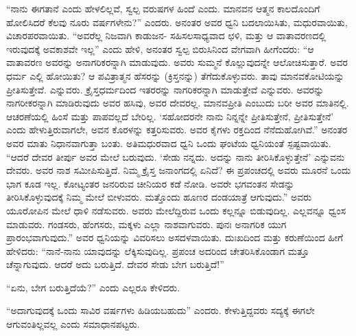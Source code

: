 “ನಾನು ಈಗತಾನೆ ಎಂದು ಹೇಳಲಿಲ್ಲವೆ, ಸ್ವಲ್ಪ ವರುಷಗಳ ಹಿಂದೆ ಎಂದು. ಮಾನವನ ಆತ್ಮನ ಕಾಲದೊಂದಿಗೆ ಹೋಲಿಸಿದರೆ ಕೆಲವು ನೂರು ವರ್ಷಗಳೇನು?” ಎಂದರು. ಅನಂತರ ಅವರ ಧ್ವನಿ ಬದಲಾಯಿಸಿತು, ಮಧುರವಾಯಿತು, ವಿಚಾರಪರವಾಯಿತು. “ಅವರೆಲ್ಲ ನಿಜವಾಗಿ ಕಾಡುಜನ- ಸಹಿಸಲಸಾಧ್ಯವಾದ ಛಳಿ, ಮತ್ತು ಆ ವಾತಾವರಣದಲ್ಲಿ ಇರುವುದಕ್ಕೆ ಅವಕಾಶವೇ ಇಲ್ಲ” ಎಂದು ಹೇಳಿ, ಅನಂತರ ಸ್ವಲ್ಪ ಬಿರುಸಿನಿಂದ ವೇಗವಾಗಿ ಹೀಗೆಂದರು: “ಆ ವಾತಾವರಣ ಅವರನ್ನು ಅನಾಗರಿಕರನ್ನಾಗಿ ಮಾಡುವುದು. ಅವರು ಸುಮ್ಮನೆ ಕೊಲ್ಲುವುದನ್ನೇ ಆಲೋಚಿಸುತ್ತಾರೆ. ಅವರ ಧರ್ಮ ಎಲ್ಲಿ ಹೋಯಿತು? ಆ ಪವಿತ್ರಾತ್ಮನ ಹೆಸರನ್ನು (ಕ್ರಿಸ್ತನನ್ನು) ತೆಗೆದುಕೊಳ್ಳುವರು. ತಾವು ಮಾನವಕೋಟಿಯನ್ನು ಪ್ರೀತಿಸುತ್ತೇವೆ. ಎನ್ನುವರು. ಕ್ರೈಸ್ತಧರ್ಮದಿಂದ ಇತರರನ್ನು ನಾಗರಿಕರನ್ನಾಗಿ ಮಾಡುತ್ತೇವೆ ಎನ್ನುವರು. ಅವರನ್ನು ನಾಗರೀಕರನ್ನಾಗಿ ಮಾಡಿರುವುದು ಅವರ ಹಸಿವು, ಅವರ ದೇವರಲ್ಲ. ಮಾನವಪ್ರೀತಿ ಎಂಬುದು ಬರೀ ಅವರ ಮಾತಿನಲ್ಲಿ. ಆಚರಣೆಯಲ್ಲಿ ಹಿಂಸೆ ಮತ್ತು ಪಾಪವಲ್ಲದೆ ಬೇರಿಲ್ಲ. ‘ಸಹೋದರನೇ ನಾನು ನಿನ್ನನ್ನೇ ಪ್ರೀತಿಸುತ್ತೇನೆ, ಪ್ರೀತಿಸುತ್ತೇನೆ’ ಎಂದು ಹೇಳುತ್ತಿರುವಾಗಲೇ, ಅವನ ಕೊರಳನ್ನು ಕತ್ತರಿಸುವರು. ಅವರ ಕೈಗಳು ರಕ್ತದಿಂದ ನೆನೆದುಹೋಗಿವೆ.” ಅನಂತರ ಅವರ ಮಾತು ನಿಧಾನವಾಗುತ್ತಾ ಬಂತು. ಅತಿಮಧುರವಾದ ಧ್ವನಿ ಒಂದು ಘಂಟೆಯ ಧ್ವನಿಯಂತೆ ಸ್ಪಷ್ಟವಾಯಿತು. “ಆದರೆ ದೇವರ ತೀರ್ಪು ಅವರ ಮೇಲೆ ಬರುವುದು. ‘ಸೇಡು ನನ್ನದು. ಅದನ್ನು ನಾನು ತೀರಿಸಿಕೊಳ್ಳುತ್ತೇನೆ’ ಎನ್ನುವನು ದೇವರು. ಅವರ ನಾಶ ಸಮೀಪಿಸುತ್ತಿದೆ. ನಿಮ್ಮ ಕ್ರೈಸ್ತ ಜನಾಂಗದಲ್ಲಿ ಏನಿದೆ? ಈ ಪ್ರಪಂಚದಲ್ಲಿ ಅವರು ಮೂರನೆ ಒಂದು ಭಾಗ ಕೂಡ ಇಲ್ಲ. ಕೋಟ್ಯಂತರ ಜನರಿರುವ ಚೀನಿಯರ ಕಡೆ ನೋಡಿ. ಅವರೇ ಭಗವಂತನ ಸೇಡನ್ನು ತೀರಿಸಿಕೊಳ್ಳುವುದಕ್ಕೆ ನಿಮ್ಮ ಮೇಲೆ ಬೀಳುವರು. ಮತ್ತೊಂದು ಹೂಣರ ದಂಡಯಾತ್ರೆ ಆಗುವುದು.” ಅವರು ಯೂರೋಪಿನ ಮೇಲೆ ಧಾಳಿ ನಡೆಸುವರು. ಅವರು ಮೇಲೆದ್ದಿರುವ ಒಂದು ಕಲ್ಲನ್ನೂ ಬಿಡುವುದಿಲ್ಲ. ಎಲ್ಲವನ್ನೂ ಧ್ವಂಸ ಮಾಡುವರು. ಗಂಡಸರು, ಹೆಂಗಸರು, ಮಕ್ಕಳು ಎಲ್ಲಾ ನಾಶವಾಗುವರು. ಪುನಃ ಅನಾಗರಿಕ ಯುಗ ಪ್ರಾರಂಭವಾಗುವುದು.” ಅವರ ಧ್ವನಿಯನ್ನು ವಿವರಿಸಲು ಅಸದಳವಾಯಿತು. ದುಃಖದಿಂದ ಮತ್ತು ಕರುಣೆಯಿಂದ ಹೀಗೆ ಹೇಳಿದರು: “ನಾನೆ-ನಾನು ಯಾವುದನ್ನು ಲೆಕ್ಕಿಸುವುದಿಲ್ಲ. ಪ್ರಪಂಚ ಅದರಿಂದ ಚೇತರಿಸಿಕೊಂಡಾಗ ಮತ್ತೂ ಚೆನ್ನಾಗುವುದು. ಆದರೆ ಅದು ಬರುತ್ತಿದೆ. ದೇವರ ಸೇಡು ಬೇಗ ಬರುತ್ತಿದೆ!”

\vskip 7pt

“ಏನು, ಬೇಗ ಬರುತ್ತಿದೆಯೆ?” ಎಂದು ಎಲ್ಲರೂ ಕೇಳಿದರು.

\vskip 7pt

“ಅದಾಗುವುದಕ್ಕೆ ಒಂದು ಸಾವಿರ ವರ್ಷಗಳು ಹಿಡಿಯಬಹುದು” ಎಂದರು. ಕೇಳುತ್ತಿದ್ದವರು ಸದ್ಯಕ್ಕೆ ಈಗಲೇ ಆಗುವಂತಿಲ್ಲವಲ್ಲ ಎಂದು ಸಮಾಧಾನಪಟ್ಟರು.

\vskip 7pt

